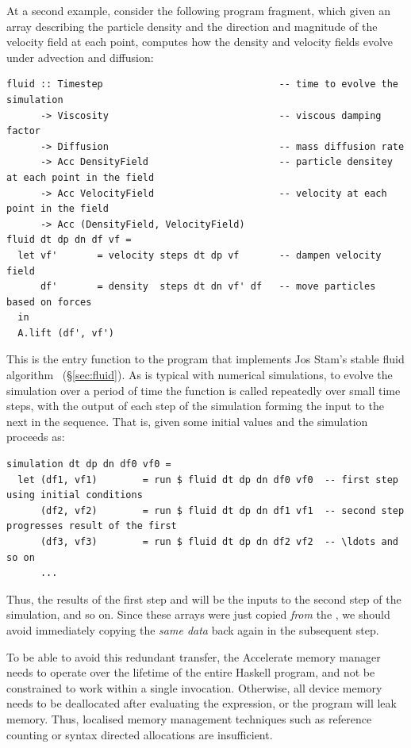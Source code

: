 At a second example, consider the following program fragment, which given an
array describing the particle density  and the direction and magnitude
of the velocity field  at each point, computes how the density and
velocity fields evolve under advection and diffusion:
%
\begin{lstlisting}[style=haskell]
fluid :: Timestep                               -- time to evolve the simulation
      -> Viscosity                              -- viscous damping factor
      -> Diffusion                              -- mass diffusion rate
      -> Acc DensityField                       -- particle densitey at each point in the field
      -> Acc VelocityField                      -- velocity at each point in the field
      -> Acc (DensityField, VelocityField)
fluid dt dp dn df vf =
  let vf'       = velocity steps dt dp vf       -- dampen velocity field
      df'       = density  steps dt dn vf' df   -- move particles based on forces
  in
  A.lift (df', vf')
\end{lstlisting}
%
This is the entry function to the program that implements Jos Stam's stable
fluid algorithm~\cite{Stam:1999ey} (\S\ref{sec:fluid}). As is typical with
numerical simulations, to evolve the simulation over a period of time the
function is called repeatedly over small time steps, with the output of each
step of the simulation forming the input to the next in the sequence. That is,
given some initial values  and  the simulation proceeds as:
%
\begin{lstlisting}[style=haskell]
simulation dt dp dn df0 vf0 =
  let (df1, vf1)        = run $ fluid dt dp dn df0 vf0  -- first step using initial conditions
      (df2, vf2)        = run $ fluid dt dp dn df1 vf1  -- second step progresses result of the first
      (df3, vf3)        = run $ fluid dt dp dn df2 vf2  -- \ldots and so on
      ...
\end{lstlisting}
%
Thus, the results of the first step  and  will be the inputs
to the second step of the simulation, and so on. Since these arrays were just
copied \emph{from} the \GPU, we should avoid immediately copying the \emph{same
data} back again in the subsequent step.

To be able to avoid this redundant transfer, the Accelerate memory manager needs
to operate over the lifetime of the entire Haskell program, and not be
constrained to work within a single  invocation. Otherwise, all device
memory needs to be deallocated after evaluating the expression, or the program
will leak memory. Thus, localised memory management techniques such as reference
counting or syntax directed allocations are insufficient.

